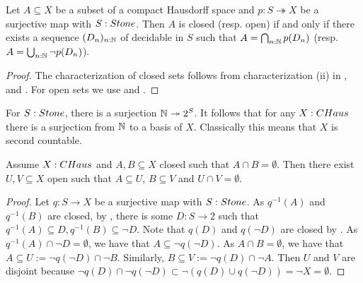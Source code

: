 \begin{corollary}\label{CompactHausdorffTopology}
Let $A\subseteq X$ be a subset of a compact Hausdorff space and $p:S\twoheadrightarrow X$ be a surjective map with $S:\Stone$. Then $A$ is closed (resp. open) if and only if there exists a sequence $(D_n)_{n:\mathbb{N}}$ of decidable in $S$ such that $A = \bigcap_{n:\mathbb{N}} p(D_n)$ (resp. $A = \bigcup_{n:\mathbb{N}} \neg p(D_n)$).
\end{corollary}
\begin{proof}
  The characterization of closed sets follows from characterization (ii) in , 
  and . 
  For open sets we use  and
  .
\end{proof}
%
\begin{remark}
  For $S:\Stone$, there is a surjection $\mathbb{N}\twoheadrightarrow 2^S$. 
  It follows that for any $X:\CHaus$ there is a surjection from $\mathbb{N}$ to a basis of $X$. 
  Classically this means that $X$ is second countable. 
\end{remark}
%
\begin{lemma}\label{CHausSeperationOfClosedByOpens}
 Assume $X:\CHaus$ and $A,B\subseteq X$ closed such that $A\cap B=\emptyset$. 
  Then there exist $U,V\subseteq X$ open such that $A\subseteq U$, $B\subseteq V$ and $U\cap V=\emptyset$. 
\end{lemma}
\begin{proof}
  Let $q:S\to X$ be a surjective map with $S:\Stone$.
  As $q^{-1}(A)$ and $q^{-1}(B)$ are closed, 
  by , there is some $D:S \to 2$ such that
  $q^{-1}(A) \subseteq D, q^{-1}(B) \subseteq \neg D$. 
  Note that $q(D)$ and $q(\neg D)$ are closed by . 
  As $q^{-1}(A) \cap \neg D  =\emptyset$, we have that 
  $A\subseteq \neg q(\neg D)$. As $A\cap B = \emptyset$, we have that 
  $A\subseteq U:= \neg q(\neg D) \cap \neg B$.
  Similarly, $B\subseteq V:=\neg  q(D) \cap \neg A$. 
  Then $U$ and $V$ are disjoint because $\neg q(D)\cap \neg q(\neg D) \subset \neg (q(D)\cup q(\neg D)) = \neg X = \emptyset$.
\end{proof}

